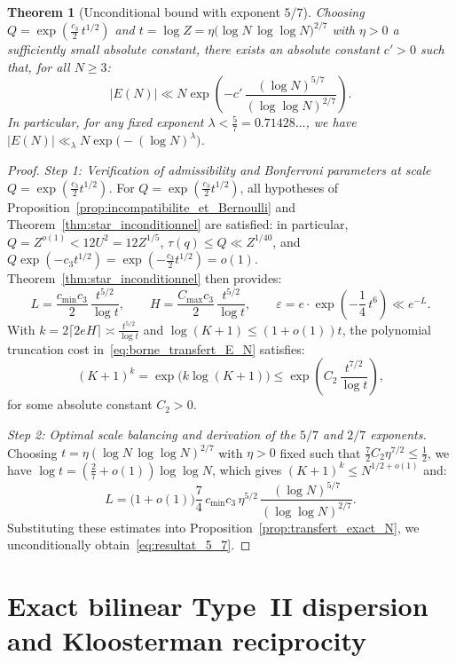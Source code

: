 \documentclass[11pt, a4paper]{article}
\theoremstyle{plain}
\newtheorem{theorem}{Theorem}[section]
\theoremstyle{definition}
\begin{document}
\begin{theorem}[Unconditional bound with exponent $5/7$]\label{thm:theoreme_5_7}
Choosing $Q = \exp\!\left(\frac{c_3}{2}\,t^{1/2}\right)$ and $t = \log Z = \eta\big(\log N\,\log\log N\big)^{2/7}$ with $\eta > 0$ a sufficiently small absolute constant, there exists an absolute constant $c' > 0$ such that, for all $N \ge 3$:
\begin{equation}\label{eq:resultat_5_7}
|E(N)| \ll N \exp\!\left( -c'\,\frac{(\log N)^{5/7}}{(\log\log N)^{2/7}} \right).
\end{equation}
In particular, for any fixed exponent $\lambda < \frac{5}{7} = 0.71428\dots$, we have $|E(N)| \ll_\lambda N \exp\big(-(\log N)^\lambda\big)$.
\end{theorem}
\begin{proof}
\emph{Step 1: Verification of admissibility and Bonferroni parameters at scale $Q = \exp(\frac{c_3}{2}t^{1/2})$.} For $Q = \exp(\frac{c_3}{2} t^{1/2})$, all hypotheses of Proposition~\ref{prop:incompatibilite_et_Bernoulli} and Theorem~\ref{thm:star_inconditionnel} are satisfied: in particular, $Q = Z^{o(1)} < 12U^2 = 12Z^{1/5}$, $\tau(q) \le Q \ll Z^{1/40}$, and $Q \exp(-c_3 t^{1/2}) = \exp(-\frac{c_3}{2} t^{1/2}) = o(1)$. Theorem~\ref{thm:star_inconditionnel} then provides:
\[
L = \frac{c_{\min} c_3}{2}\,\frac{t^{5/2}}{\log t}, \qquad H = \frac{C_{\max} c_3}{2}\,\frac{t^{5/2}}{\log t}, \qquad \varepsilon = e \cdot \exp\!\left(-\frac{1}{4}\,t^6\right) \ll e^{-L}.
\]
With $k = 2\lceil 2eH \rceil \asymp \frac{t^{5/2}}{\log t}$ and $\log(K+1) \le (1 + o(1))t$, the polynomial truncation cost in~\eqref{eq:borne_transfert_E_N} satisfies:
\[
(K+1)^k = \exp\!\big(k \log(K+1)\big) \le \exp\!\left( C_2\,\frac{t^{7/2}}{\log t} \right),
\]
for some absolute constant $C_2 > 0$.

\medskip\noindent
\emph{Step 2: Optimal scale balancing and derivation of the $5/7$ and $2/7$ exponents.} Choosing $t = \eta (\log N\,\log\log N)^{2/7}$ with $\eta > 0$ fixed such that $\frac{7}{2} C_2 \eta^{7/2} \le \frac{1}{2}$, we have $\log t = \left(\frac{2}{7} + o(1)\right)\log\log N$, which gives $(K+1)^k \le N^{1/2+o(1)}$ and:
\[
L = \big(1 + o(1)\big)\frac{7}{4}\,c_{\min} c_3\,\eta^{5/2}\,\frac{(\log N)^{5/7}}{(\log\log N)^{2/7}}.
\]
Substituting these estimates into Proposition~\ref{prop:transfert_exact_N}, we unconditionally obtain~\eqref{eq:resultat_5_7}.
\end{proof}

\section{Exact bilinear Type~II dispersion and Kloosterman reciprocity}\label{sec:bilinear_dispersion}
\end{document}
